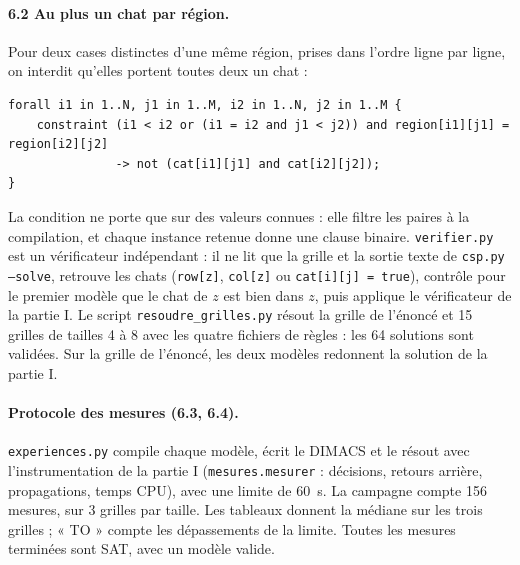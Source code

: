 \documentclass[11pt,a4paper]{article}
\newcommand{\code}[1]{\texttt{#1}}
\begin{document}
\paragraph{6.2 Au plus un chat par région.} Pour deux cases distinctes d'une même région,
prises dans l'ordre ligne par ligne, on interdit qu'elles portent toutes deux un chat :
\begin{verbatim}
forall i1 in 1..N, j1 in 1..M, i2 in 1..N, j2 in 1..M {
    constraint (i1 < i2 or (i1 = i2 and j1 < j2)) and region[i1][j1] = region[i2][j2]
               -> not (cat[i1][j1] and cat[i2][j2]);
}
\end{verbatim}
La condition ne porte que sur des valeurs connues : elle filtre les paires à la compilation,
et chaque instance retenue donne une clause binaire. \code{verifier.py} est un vérificateur
indépendant : il ne lit que la grille et la sortie texte de \code{csp.py --solve}, retrouve les
chats (\code{row[z]}, \code{col[z]} ou \code{cat[i][j] = true}), contrôle pour le premier modèle
que le chat de $z$ est bien dans $z$, puis applique le vérificateur de la partie I. Le script
\code{resoudre\_grilles.py} résout la grille de l'énoncé et 15 grilles de tailles 4 à 8 avec
les quatre fichiers de règles : les 64 solutions sont validées. Sur la grille de l'énoncé, les
deux modèles redonnent la solution de la partie I.

\paragraph{Protocole des mesures (6.3, 6.4).} \code{experiences.py} compile chaque modèle,
écrit le DIMACS et le résout avec l'instrumentation de la partie I (\code{mesures.mesurer} :
décisions, retours arrière, propagations, temps CPU), avec une limite de 60~s. La campagne
compte 156 mesures, sur 3 grilles par taille. Les tableaux donnent la médiane sur les trois
grilles ; « TO » compte les dépassements de la limite. Toutes les mesures terminées sont
SAT, avec un modèle valide.
\end{document}

